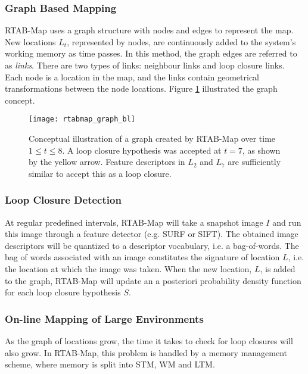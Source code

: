 \subsubsection{Graph Based Mapping}

\ac{RTAB-Map} uses a graph structure with nodes and edges to represent the map. New locations $L_t$, represented by nodes, are continuously added to the system's working memory as time passes. In this method, the graph edges are referred to as \textit{links}. There are two types of links: neighbour links and loop closure links. Each node is a location in the map, and the links contain geometrical transformations between the node locations. Figure \ref{fig:rtabmap_graph} illustrated the graph concept.

\begin{figure}[h]
    \centering
    \texttt{[image: rtabmap\_graph\_bl]}
    \caption{Conceptual illustration of a graph created by \ac{RTAB-Map} over time $1 \leq t \leq 8 $. A loop closure hypothesis was accepted at $t=7$, as shown by the yellow arrow. Feature descriptors in $L_2$ and $L_7$ are sufficiently similar to accept this as a loop closure.}
    \label{fig:rtabmap_graph}
\end{figure}

\subsubsection{Loop Closure Detection}

At regular predefined intervals, \ac{RTAB-Map} will take a snapshot image $I$ and run this image through a feature detector (e.g. \ac{SURF} or \ac{SIFT}). The obtained image descriptors will be quantized to a descriptor vocabulary, i.e. a bag-of-words. The bag of words associated with an image constitutes the signature of location $L$, i.e. the location at which the image was taken. When the new location, $L$, is added to the graph, \ac{RTAB-Map} will update an a posteriori probability density function for each loop closure hypothesis $S$. 

\subsubsection{On-line Mapping of Large Environments}

As the graph of locations grow, the time it takes to check for loop closures will also grow. In \ac{RTAB-Map}, this problem is handled by a memory management scheme, where memory is split into \ac{STM}, \ac{WM} and \ac{LTM}.

